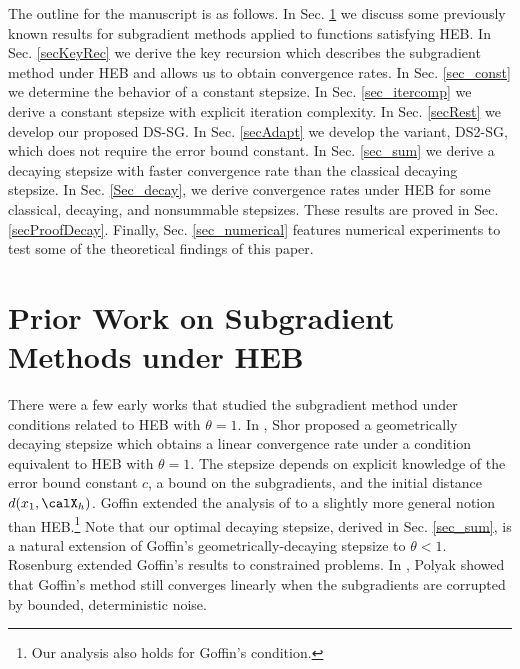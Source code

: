 \documentclass[smallextended]{svjour3}
\begin{document}
The outline for the manuscript is as follows. In Sec. \ref{Sec_subgHist} we discuss some previously known results for subgradient methods applied to functions satisfying HEB. In Sec. \ref{secKeyRec} we derive the key recursion which describes the subgradient method under HEB and allows us to obtain convergence rates. In Sec. \ref{sec_const} we determine the behavior of a constant stepsize. In Sec. \ref{sec_itercomp} we derive a constant stepsize with explicit iteration complexity. In Sec. \ref{secRest} we develop our proposed DS-SG. In Sec. \ref{secAdapt} we develop the variant, DS2-SG, which does not require the error bound constant. In Sec. \ref{sec_sum} we derive a decaying stepsize with faster convergence rate than the classical decaying stepsize. In Sec. \ref{Sec_decay}, we derive convergence rates under HEB for some classical, decaying, and nonsummable stepsizes. These results are proved in Sec. \ref{secProofDecay}. Finally, Sec. \ref{sec_numerical} features numerical experiments to test some of the theoretical findings of this paper. 

\section{Prior Work on Subgradient Methods under HEB}\label{Sec_subgHist}

There were a few early works that studied the subgradient method under conditions related to HEB with $\theta=1$. In \cite[Thm 2.7, Sec. 2.3]{shor2012minimization}, Shor proposed a geometrically decaying stepsize which obtains a linear convergence rate under a condition equivalent to HEB with $\theta=1$. The stepsize depends on explicit knowledge of the error bound constant $c$, a bound on the subgradients, and the initial distance $d(x_1,\calX_h)$. Goffin \cite{goffin1977convergence} extended the analysis of \cite{shor2012minimization} to a slightly more general notion than HEB.\footnote{Our analysis also holds for Goffin's condition.}  Note that our optimal decaying stepsize, derived in Sec. \ref{sec_sum}, is a natural extension of Goffin's geometrically-decaying stepsize to $\theta<1$.  Rosenburg \cite{rosenberg1988geometrically} extended Goffin's results to constrained problems. In \cite{poljak1978nonlinear}, Polyak showed that Goffin's  method still converges linearly when the subgradients are corrupted by bounded, deterministic noise.
\end{document}
